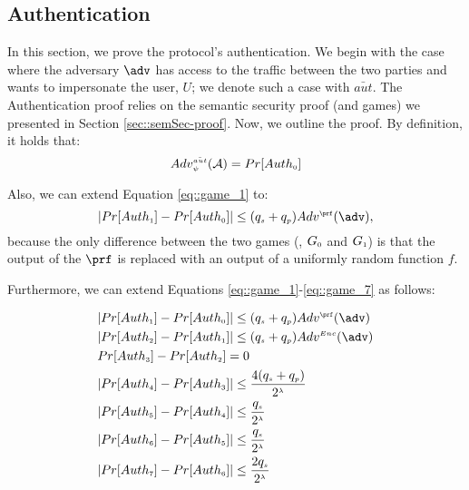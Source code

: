


\subsection{Authentication}

In this section, we prove the protocol's authentication. We begin with the case where the adversary $\adv$ has access to the traffic between the two parties and wants to impersonate the user, $U$; we denote such a case with $\bar {aut}$. The Authentication proof relies on the semantic security proof (and games) we presented in Section \ref{sec::semSec-proof}.  Now, we outline the proof.  By definition, it holds that:
%
 \begin{equation}\label{eq::adv-ake}
Adv_{\scriptscriptstyle \psi}^{\scriptscriptstyle \bar {aut}}(\mathcal{A})=Pr[Auth_{\scriptscriptstyle  0}]
\end{equation}


Also, we can extend Equation \ref{eq::game_1} to:
%
\begin{equation*}
|Pr[Auth_{\sss  1}]-Pr[Auth_{\sss  0}]| \leq (q_{\sss s}+q_{\sss p})Adv^{\sss\prf}(\adv),
\end{equation*}
%
 because the only difference between the two games (\ie, $G_{\scriptscriptstyle  0}$ and $G_{\scriptscriptstyle  1}$) is that the output of the $\prf$ is replaced with an output of a uniformly random function $f$. 
 
 
 Furthermore, we can extend Equations \ref{eq::game_1}-\ref{eq::game_7} as follows: 
 
 
 \begin{equation*}
 \begin{split}
  &  |Pr[Auth_{\sss  1}]-Pr[Auth_{\sss  0}]| \leq (q_{\sss s}+q_{\sss p}) Adv^{\sss \prf}(\adv) \\ 
 &  |Pr[Auth_{\sss  2}]-Pr[Auth_{\sss 1}]| \leq (q_{\sss s}+q_{\sss p}) Adv^{\sss Enc}(\adv) \\ 
 & Pr[Auth_{\sss  3}]-Pr[Auth_{\sss  2}]=0\\
 & |Pr[Auth_{\sss  4}]-Pr[Auth_{\sss  3}]|\leq \frac{4(q_{\sss  s}+q_{\sss  p})}{2^{\sss \lambda}}\\
 & |Pr[Auth_{\sss  5}]-Pr[Auth_{\sss  4}]|\leq \frac{q_{\sss  s}}{2^{\sss \lambda}}\\
 & |Pr[Auth_{\sss  6}]-Pr[Auth_{\sss  5}]|\leq \frac{q_{\sss  s}}{2^{\sss \lambda}}\\
 & |Pr[Auth_{\sss  7}]-Pr[Auth_{\sss  6}]|\leq \frac{2q_{\sss  s}}{2^{\sss \lambda}}
\end{split}
\end{equation*}

